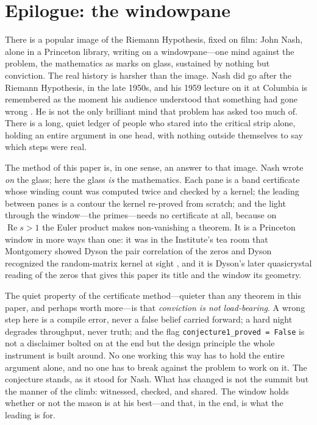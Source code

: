 \section*{Epilogue: the windowpane}

There is a popular image of the Riemann Hypothesis, fixed on film: John Nash,
alone in a Princeton library, writing on a windowpane---one mind against the
problem, the mathematics as marks on glass, sustained by nothing but conviction.
The real history is harsher than the image. Nash did go after the Riemann
Hypothesis, in the late 1950s, and his 1959 lecture on it at Columbia is
remembered as the moment his audience understood that something had gone
wrong \cite{nasar1998}. He is not the only brilliant mind that problem has
asked too much of. There is a long, quiet ledger of people who stared into the
critical strip alone, holding an entire argument in one head, with nothing
outside themselves to say which steps were real.

The method of this paper is, in one sense, an answer to that image. Nash wrote
\emph{on} the glass; here the glass \emph{is} the mathematics. Each pane is a
band certificate whose winding count was computed twice and checked by a
kernel; the leading between panes is a contour the kernel re-proved from
scratch; and the light through the window---the primes---needs no certificate
at all, because on $\operatorname{Re} s > 1$ the Euler product makes
non-vanishing a theorem. It is a Princeton window in more ways than one: it was
in the Institute's tea room that Montgomery showed Dyson the pair correlation
of the zeros and Dyson recognized the random-matrix kernel at sight
\cite{montgomery1973}, and it is Dyson's later quasicrystal reading of the
zeros \cite{dyson2009} that gives this paper its title and the window its
geometry.

The quiet property of the certificate method---quieter than any theorem in
this paper, and perhaps worth more---is that \emph{conviction is not
load-bearing}. A wrong step here is a compile error, never a false belief
carried forward; a hard night degrades throughput, never truth; and the flag
\texttt{conjecture1\_proved = False} is not a disclaimer bolted on at the end
but the design principle the whole instrument is built around. No one working
this way has to hold the entire argument alone, and no one has to break
against the problem to work on it. The conjecture stands, as it stood for
Nash. What has changed is not the summit but the manner of the climb:
witnessed, checked, and shared. The window holds whether or not the mason is
at his best---and that, in the end, is what the leading is for.

